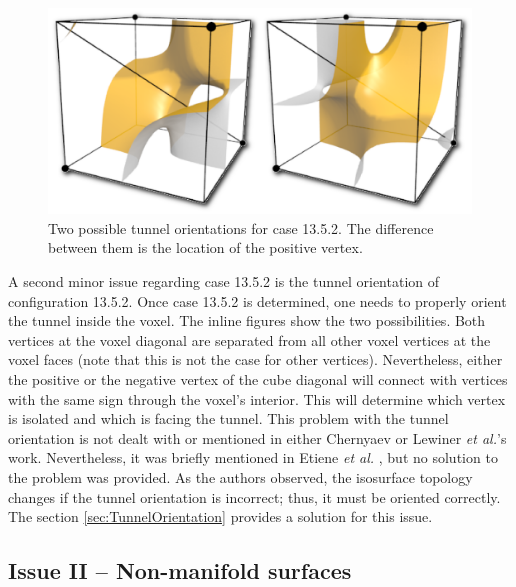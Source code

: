 \begin{figure}[b]
     \centering
     \includegraphics[width=0.6\linewidth]{chapter4/figures/tunnel.png}
     \caption{Two possible tunnel orientations for case 13.5.2. The difference between them is the location of the positive vertex.}
\end{figure}
A second minor issue regarding case 13.5.2 is the tunnel orientation of configuration 13.5.2. Once case 13.5.2 is determined, one needs to properly orient the tunnel inside the voxel. The inline figures show the two possibilities. Both vertices at the voxel diagonal are separated from all other voxel vertices at the voxel faces (note that this is not the case for other vertices). Nevertheless, either the positive or the negative vertex of the cube diagonal will connect with vertices with the same sign through the voxel's interior. This will determine which vertex is isolated and which is facing the tunnel. This problem with the tunnel orientation is not dealt with or mentioned in either Chernyaev or Lewiner \emph{et al.}'s work. Nevertheless, it was briefly mentioned in Etiene \emph{et al.} \cite{Etiene:2012:TVI:2197070.2197097}, but no solution to the problem was provided. As the authors observed, the isosurface topology changes if the tunnel orientation is incorrect; thus, it must be oriented correctly. The section \ref{sec:TunnelOrientation} provides a solution for this issue.

\subsection{Issue II -- Non-manifold surfaces}
\label{sec:non-manifold-surfaces}

